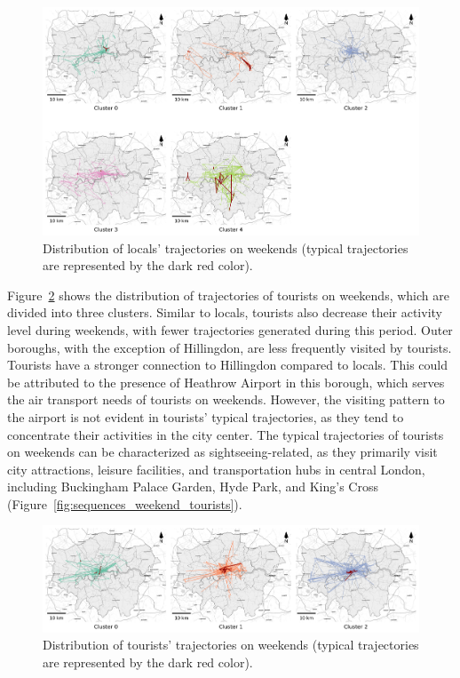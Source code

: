 \documentclass{article}
\theoremstyle{remark}
\begin{document}
\begin{figure}[!h]
\centering
\includegraphics[width=1\textwidth]{figures/traj_distribution_weekend_locals.png}
\caption{\label{fig:traj_distribution_weekend_locals}Distribution of locals' trajectories on weekends (typical trajectories are represented by the dark red color).}
\end{figure}


Figure~\ref{fig:traj_distribution_weekend_tourists} shows the distribution of trajectories of tourists on weekends, which are divided into three clusters. Similar to locals, tourists also decrease their activity level during weekends, with fewer trajectories generated during this period. Outer boroughs, with the exception of Hillingdon, are less frequently visited by tourists. Tourists have a stronger connection to Hillingdon compared to locals. This could be attributed to the presence of Heathrow Airport in this borough, which serves the air transport needs of tourists on weekends. However, the visiting pattern to the airport is not evident in tourists’ typical trajectories, as they tend to concentrate their activities in the city center. The typical trajectories of tourists on weekends can be characterized as sightseeing-related, as they primarily visit city attractions, leisure facilities, and transportation hubs in central London, including Buckingham Palace Garden, Hyde Park, and King's Cross (Figure~\ref{fig:sequences_weekend_tourists}).

\begin{figure}[!h]
\centering
\includegraphics[width=1\textwidth]{figures/traj_distribution_weekend_tourists.png}
\caption{\label{fig:traj_distribution_weekend_tourists}Distribution of tourists' trajectories on weekends (typical trajectories are represented by the dark red color).}
\end{figure}
\end{document}
